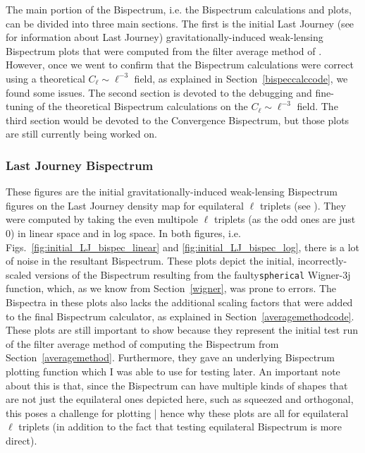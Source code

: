 \documentclass[11pt]{article}
\renewcommand{\_}[1]{\underline{ #1 }}
\begin{document}
{The main portion of the Bispectrum, i.e. the Bispectrum calculations and plots, can be divided into three main sections. The first is the initial Last Journey (see \cite{Heitmann_2021} for information about Last Journey) gravitationally-induced weak-lensing Bispectrum plots that were computed from the filter average method of \cite{Munshi_2020}. However, once we went to confirm that the Bispectrum calculations were correct using a theoretical $C_{\ell} \sim \ell^{-3}$ field, as explained in Section~\ref{bispeccalccode}, we found some issues. The second section is devoted to the debugging and fine-tuning of the theoretical Bispectrum calculations on the $C_{\ell} \sim \ell^{-3}$ field. The third section would be devoted to the Convergence Bispectrum, but those plots are still currently being worked on.

\subsubsection{Last Journey Bispectrum}

These figures are the initial gravitationally-induced weak-lensing Bispectrum figures on the Last Journey density map for equilateral $\ell$ triplets (see \cite{Heitmann_2021}). They were computed by taking the even multipole $\ell$ triplets (as the odd ones are just 0) in linear space and in log space. In both figures, i.e. Figs.~\ref{fig:initial_LJ_bispec_linear} and \ref{fig:initial_LJ_bispec_log}, there is a lot of noise in the resultant Bispectrum. These plots depict the initial, incorrectly-scaled versions of the Bispectrum resulting from the faulty\texttt{spherical} Wigner-3j function, which, as we know from Section~\ref{wigner}, was prone to errors. The Bispectra in these plots also lacks the additional scaling factors that were added to the final Bispectrum calculator, as explained in Section~\ref{averagemethodcode}. These plots are still important to show because they represent the initial test run of the filter average method of computing the Bispectrum from Section~\ref{averagemethod}. Furthermore, they gave an underlying Bispectrum plotting function which I was able to use for testing later. An important note about this is that, since the Bispectrum can have multiple kinds of shapes that are not just the equilateral ones depicted here, such as squeezed and orthogonal, this poses a challenge for plotting | hence why these plots are all for equilateral $\ell$ triplets (in addition to the fact that testing equilateral Bispectrum is more direct).

}
\end{document}
